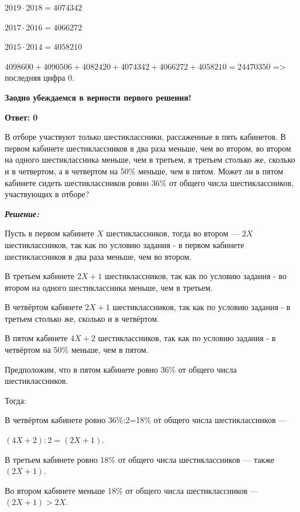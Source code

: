 $2019\cdot2018=4074342$ 

$2017\cdot2016=4066272$ 

$2015\cdot2014=4058210$ 

$4098600 + 4090506 + 4082420 + 4074342 + 4066272 + 4058210 = 24470350$ => последняя цифра 0.

\textbf{Заодно убеждаемся в верности первого решения!}

\textbf{Ответ: 0}





\hspace{3mm}

 В отборе участвуют только шестиклассники, рассаженные в пять кабинетов. В первом кабинете шестиклассников в два раза меньше, чем во втором, во втором на одного шестиклассника меньше, чем в третьем, в третьем столько же, сколько и в четвертом, а в четвертом на 50\% меньше, чем в пятом. Может ли в пятом кабинете сидеть шестиклассников ровно 36\% от общего числа шестиклассников, участвующих в отборе?

\hspace{3mm}

\centerline{\textbf{\textit{Решение:}}}

Пусть в первом кабинете $X$ шестиклассников, тогда во втором — $2X$ шестиклассников, так как по условию задания - в первом кабинете шестиклассников в два раза меньше, чем во втором.

В третьем кабинете $2X+1$ шестиклассников, так как по условию задания - во втором на одного шестиклассника меньше, чем в третьем.

\newpage
\hspace{3mm}

В четвёртом кабинете $2X+1$ шестиклассников, так как по условию задания - в третьем столько же, сколько и в четвёртом.

В пятом кабинете $4X+2$ шестиклассников, так как по условию задания - в четвёртом на 50\% меньше, чем в пятом.

Предположим, что в пятом кабинете ровно 36\% от общего числа шестиклассников.

Тогда:

В четвёртом кабинете ровно 36\%:2=18\% от общего числа шестиклассников — 

$(4X+2):2=(2X+1)$.

В третьем кабинете ровно 18\% от общего числа шестиклассников — также $(2X+1)$.

Во втором кабинете меньше 18\% от общего числа шестиклассников — $(2X+1)>2X$.

